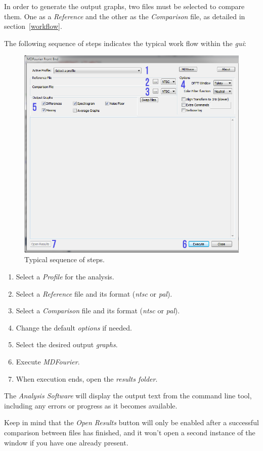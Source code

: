 \documentclass[10pt,a4paper]{report}
\newcommand{\ac}[1]{\textit{\mbox{\acrshort{#1}}}}
\begin{document}
\begin{appendices}
In order to generate the output graphs, two files must be selected to compare them. One as a \textit{Reference} and the other as the \textit{Comparison} file, as detailed in section~\ref{workflow}.

The following sequence of steps indicates the typical work flow within the \ac{gui}:

\begin{figure}[H]
	\centering
	\includegraphics[width=0.6\linewidth]{images/GUI/GUI2.png}
	\caption[Steps]{Typical sequence of steps.}
	\label{fig:gui2}
\end{figure}

\begin{enumerate}
	\item Select a \textit{Profile} for the analysis.
	\item Select a \textit{Reference} file and its format (\ac{ntsc} or \ac{pal}).
	\item Select a \textit{Comparison} file and its format (\ac{ntsc} or \ac{pal}).
	\item Change the default \textit{options} if needed.
	\item Select the desired output \textit{graphs}.
	\item Execute \textit{MDFourier}.
	\item When execution ends, open the \textit{results folder}.
\end{enumerate}

The \textit{Analysis Software} will display the output text from the command line tool, including any errors or progress as it becomes available.

Keep in mind that the \textit{Open Results} button will only be enabled after a successful comparison between files has finished, and it won't open a second instance of the window if you have one already present.


\end{appendices}
\end{document}
